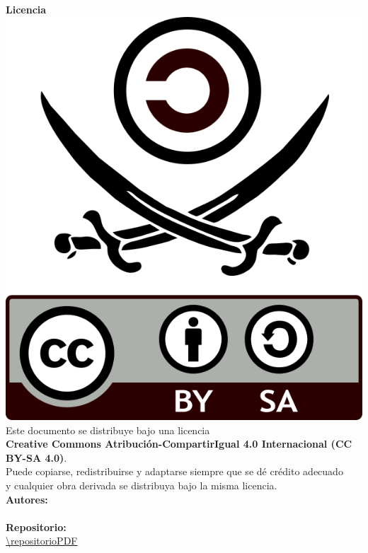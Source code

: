 \clearpage
\thispagestyle{empty}

\vspace*{\fill}

\begin{center}
    {\LARGE \textbf{Licencia}} \\[2em]

    \includegraphics[width=.5\textwidth]{img/cc-by-sa.png} \\[2em]

    {\normalsize
    Este documento se distribuye bajo una licencia \\
    \textbf{Creative Commons Atribución-CompartirIgual 4.0 Internacional (CC BY-SA 4.0)}.\\[1.5em]
    Puede copiarse, redistribuirse y adaptarse siempre que se dé crédito adecuado \\
    y cualquier obra derivada se distribuya bajo la misma licencia.
    } \\[3em]

    {\large \textbf{Autores:}} \\[0.5em]
    {\normalsize \autoresPDF} \\[2em]

    {\large \textbf{Repositorio:}} \\[0.5em]
    {\normalsize \url{\repositorioPDF}}
\end{center}

\vspace*{.5cm}

\clearpage
{}    %
\setcounter{page}{0}      %
